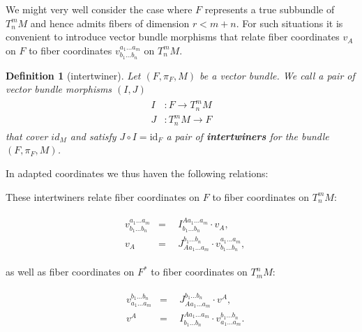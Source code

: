 \documentclass[%
preprint,
nofootinbib,
amsmath,amssymb,
aps,
prd,
floatfix,
]{revtex4-2}
\newtheorem{definition}{Definition}
\begin{document}
\iffalse
i.e., these two sets of coordinate functions satisfy:
\begin{align}
    v^Av_B = \delta^A_B.
\end{align}
\fi

We might very well consider the case where $F$ represents a true subbundle of $T^m_nM$ and hence admits fibers of dimension $r < m+n$. For such situations it is convenient to introduce vector bundle morphisms that relate fiber coordinates $v_A$ on $F$ to fiber coordinates $v^{a_1 ... a_m}_{b_1 ... b_n}$ on $T^m_nM$.

\begin{definition}[intertwiner]\label{interDef}
Let $(F,\pi_F,M)$ be a vector bundle. We call a pair of vector bundle morphisms $(I, J)$
\begin{align}
    \begin{aligned}
    I&: F \longrightarrow T^m_n M\\
    J&: T^m_n M \longrightarrow F 
    \end{aligned}
\end{align}
that cover $id_M$ and satisfy
$J \circ I = \mathrm{id}_F$ a pair of \textbf{\textit{intertwiners}} for the bundle $(F, \pi_F, M)$.
\end{definition}
In adapted coordinates we thus haven the following relations:

\iffalse
These intertwiners relate fiber coordinates on $F$ to fiber coordinates on $T^m_nM$:

\begin{align} \label{interRel1}
    \begin{aligned}
    & v^{a_1 ... a_m}_{b_1 ... b_n} & = & \ \ I^{A a_1 ... a_m}_{b_1 ... b_n} \cdot v_{A},\\  
    & v_A & = & \ \ J^{b_1 ... b_n}_{A a_1 ... a_m} \cdot v^{a_1 ... a_m}_{b_1 ... b_n},
    \end{aligned}
\end{align}

as well as fiber coordinates on $F^\ast$ to fiber coordinates on $T^n_mM$:

\begin{align} \label{interRel2}
    \begin{aligned}
    & v^{b_1 ... b_n}_{a_1 ... a_m} & = & \ \ J^{b_1 ... b_n}_{A a_1 ... a_m} \cdot v^{A},\\  
    & v^A & = & \ \  I^{A a_1 ... a_m}_{b_1 ... b_n} \cdot v^{b_1 ... b_n}_{a_1 ... a_m}.
    \end{aligned}
\end{align}
\end{document}
